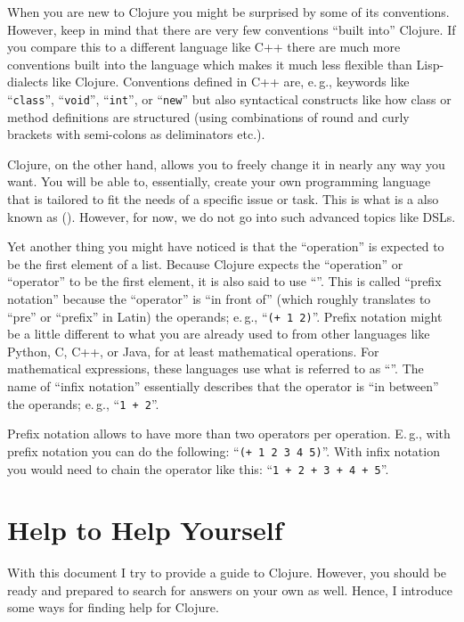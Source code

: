 When you are new to Clojure you might be surprised by some of its conventions.
However, keep in mind that there are very few conventions ``built into'' Clojure.
If you compare this to a different language like C++ there are much more conventions built into the language which makes it much less flexible than Lisp-dialects like Clojure.
Conventions defined in C++ are, e.\,g., keywords like ``\texttt{class}'', ``\texttt{void}'', ``\texttt{int}'', or ``\texttt{new}'' but also syntactical constructs like how class or method definitions are structured (using combinations of round and curly brackets with semi-colons as deliminators etc.).

Clojure, on the other hand, allows you to freely change it in nearly any way you want.
You will be able to, essentially, create your own programming language that is tailored to fit the needs of a specific issue or task.
This is what is a also known as  ().
However, for now, we do not go into such advanced topics like DSLs.

Yet another thing you might have noticed is that the ``operation'' is expected to be the first element of a list.
Because Clojure expects the ``operation'' or ``operator'' to be the first element, it is also said to use ``''.
This is called ``prefix notation'' because the ``operator'' is ``in front of'' (which roughly translates to ``pre'' or ``prefix'' in Latin) the operands; e.\,g., ``\texttt{(+ 1 2)}''.
Prefix notation might be a little different to what you are already used to from other languages like Python, C, C++, or Java, for at least mathematical operations.
For mathematical expressions, these languages use what is referred to as ``''.
The name of ``infix notation'' essentially describes that the operator is ``in between'' the operands; e.\,g., ``\texttt{1 + 2}''. 

Prefix notation allows to have more than two operators per operation.
E.\,g., with prefix notation you can do the following: ``\texttt{(+ 1 2 3 4 5)}''.
With infix notation you would need to chain the operator like this: ``\texttt{1 + 2 + 3 + 4 + 5}''.

\section{Help to Help Yourself}
With this document I try to provide a guide to Clojure.
However, you should be ready and prepared to search for answers on your own as well.
Hence, I introduce some ways for finding help for Clojure.

